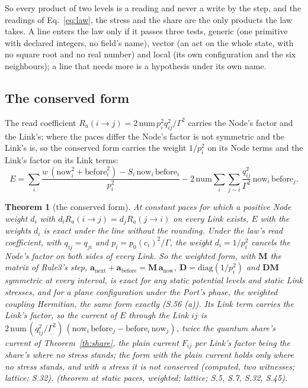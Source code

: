 \documentclass[pdflatex,sn-mathphys-num]{sn-jnl}
\newcommand{\num}{\mathrm{num}}
\newcommand{\bM}{\mathbf M}
\newcommand{\bD}{\mathbf D}
\theoremstyle{thmstyleone}
\newtheorem{theorem}{Theorem}
\theoremstyle{thmstyletwo}
\begin{document}
So every product of two levels is a reading and never a write by the step, and the readings of Eq.~\eqref{eq:law}, the stress and the share are the only products the law takes. A line enters the law only if it passes three tests, generic (one primitive with declared integers, no field's name), vector (an act on the whole state, with no square root and no real number) and local (its own configuration and the six neighbours); a line that needs more is a hypothesis under its own name.

\subsection{The conserved form}\label{sec:form}

The read coefficient $R_a(i \to j) = 2\,\num\,p_i^2 q_{ij}^2 / \Gamma^2$ carries the Node's factor and the Link's; where the paces differ the Node's factor is not symmetric and the Link's is, so the conserved form carries the weight $1 / p_i^2$ on its Node terms and the Link's factor on its Link terms:
\begin{equation}\label{eq:form}
\boxed{E = \sum_i \frac{w\,(\mathrm{now}_i^2 + \mathrm{before}_i^2) - S_i\,\mathrm{now}_i\,\mathrm{before}_i}{p_i^2} - 2\,\num\sum_i \sum_{j \sim i} \frac{q_{ij}^2}{\Gamma^2}\,\mathrm{now}_i\,\mathrm{before}_j}.
\end{equation}

\begin{theorem}[the conserved form]\label{th:form}
At constant paces for which a positive Node weight $d_i$ with $d_i R_a(i \to j) = d_j R_a(j \to i)$ on every Link exists, $E$ with the weights $d_i$ is exact under the line without the rounding. Under the law's read coefficient, with $q_{ij} = q_{ji}$ and $p_i = p_0(c_i)^2 / \Gamma$, the weight $d_i = 1 / p_i^2$ cancels the Node's factor on both sides of every Link. So the weighted form, with $\bM$ the matrix of Rule3's step, $\mathbf a_{\mathrm{next}} + \mathbf a_{\mathrm{before}} = \bM\,\mathbf a_{\mathrm{now}}$, $\bD = \mathrm{diag}(1 / p_i^2)$ and $\bD\bM$ symmetric at every interval, is exact for any static potential levels and static Link stresses, and for a plane configuration under the Port's phase, the weighted coupling Hermitian, the same form exactly (S.56 (a)). Its Link term carries the Link's factor, so the current of $E$ through the Link $ij$ is $2\,\num\,(q_{ij}^2 / \Gamma^2)\,(\mathrm{now}_i\,\mathrm{before}_j - \mathrm{before}_i\,\mathrm{now}_j)$, twice the quantum share's current of Theorem~\ref{th:share}, the plain current $F_{ij}$ per Link's factor being the share's where no stress stands; the form with the plain current holds only where no stress stands, and with a stress it is not conserved (computed, two witnesses; lattice; S.32). (theorem at static paces, weighted; lattice; S.5, S.7, S.32, S.45).
\end{theorem}
\end{document}
